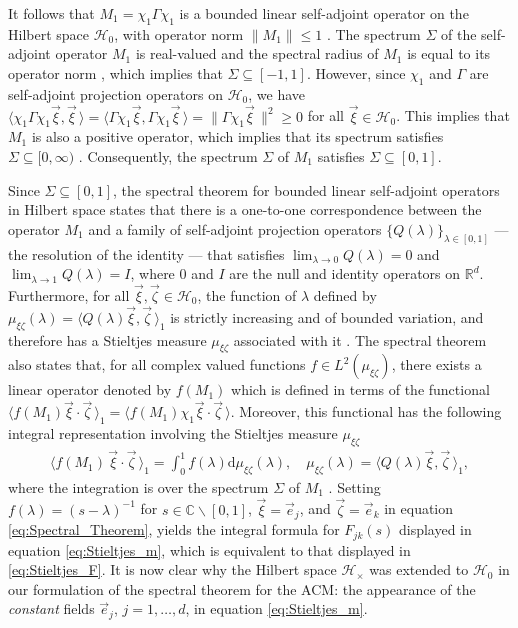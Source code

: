 \documentclass{cmslatex}
\renewcommand{\d}{\text{d}}
\begin{document}
It follows that $M_1=\chi_1\Gamma\chi_1$ is a bounded linear self-adjoint
operator on the Hilbert space $\mathscr{H}_0$, with operator norm
$\|M_1\|\leq1$ \cite{Reed-1980,Stone:64}. The spectrum $\Sigma$ of the
self-adjoint operator $M_1$ is real-valued and the spectral radius of $M_1$ is equal to
its operator norm \cite{Reed-1980}, which implies that
$\Sigma\subseteq[-1,1]$. However, since $\chi_1$ and $\Gamma$ are self-adjoint projection
operators on $\mathscr{H}_0$, we have 
$\langle\chi_1\Gamma\chi_1\vec{\xi},\vec{\xi}\,\rangle=\langle\Gamma\chi_1\vec{\xi},\Gamma\chi_1\vec{\xi}\,\rangle=\|\Gamma\chi_1\vec{\xi}\,\|^2\geq0$ 
for all $\vec{\xi}\in\mathscr{H}_0$. This implies that $M_1$ is also a
positive operator, which implies that its spectrum satisfies $\Sigma\subseteq[0,\infty)$
\cite{Stone:64}.  Consequently, the spectrum $\Sigma$ of $M_1$ satisfies
$\Sigma\subseteq[0,1]$.       



Since $\Sigma\subseteq[0,1]$, the spectral theorem for bounded linear self-adjoint
operators in Hilbert space \cite{Stone:64} states that there is a
one-to-one correspondence between the operator $M_1$ and a family of
self-adjoint projection operators $\{Q(\lambda)\}_{\lambda\in[0,1]}$ --- the
resolution of the identity --- that satisfies $\lim_{\lambda\to0}Q(\lambda)=0$ and
$\lim_{\lambda\to1}Q(\lambda)=I$, where $0$ and $I$ are the null and identity
operators on $\mathbb{R}^d$. Furthermore, for all
$\vec{\xi},\vec{\zeta}\in\mathscr{H}_0$, the function of $\lambda$ defined by 
$\mu_{\xi\zeta}(\lambda)=\langle Q(\lambda)\vec{\xi},\vec{\zeta}\,\rangle_1$ is strictly increasing and of
bounded variation, and therefore has a Stieltjes measure $\mu_{\xi\zeta}$
associated with it \cite{Stieltjes:1995,Stone:64,Folland:95}. The
spectral theorem also states that, for all complex
valued functions $f\in L^2(\mu_{\xi\zeta})$, there exists a linear operator
denoted by $f(M_1)$ which is defined in terms of the functional
$\langle f(M_1)\vec{\xi}\cdot\vec{\zeta}\,\rangle_1=\langle f(M_1)\chi_1\vec{\xi}\cdot\vec{\zeta}\,\rangle$. Moreover,
this functional has the following integral representation involving the
Stieltjes measure $\mu_{\xi\zeta}$  
% 
\begin{align}\label{eq:Spectral_Theorem}  
  \langle f(M_1)\,\vec{\xi}\cdot\vec{\zeta}\,\rangle_1= \int_0^1f(\lambda)\d\mu_{\xi\zeta}(\lambda), \quad
  \mu_{\xi\zeta}(\lambda)=\langle Q(\lambda)\vec{\xi},\vec{\zeta}\,\rangle_1,
\end{align}
%
where the integration is over the spectrum $\Sigma$ of $M_1$
\cite{Reed-1980,Stone:64}. Setting $f(\lambda)=(s-\lambda)^{-1}$ for 
$s\in\mathbb{C}\backslash[0,1]$, $\vec{\xi}=\vec{e}_j$, and $\vec{\zeta}=\vec{e}_k$ in
equation \eqref{eq:Spectral_Theorem}, yields the integral formula for
$F_{jk}(s)$ displayed in equation \eqref{eq:Stieltjes_m}, which is
equivalent to that displayed in \eqref{eq:Stieltjes_F}. It is now
clear why the Hilbert space $\mathscr{H}_\times$ was extended to
$\mathscr{H}_0$ in our formulation of the spectral theorem for the
ACM: the appearance of the \emph{constant} fields $\vec{e}_j$,
$j=1,\ldots,d$, in equation \eqref{eq:Stieltjes_m}.
\end{document}
